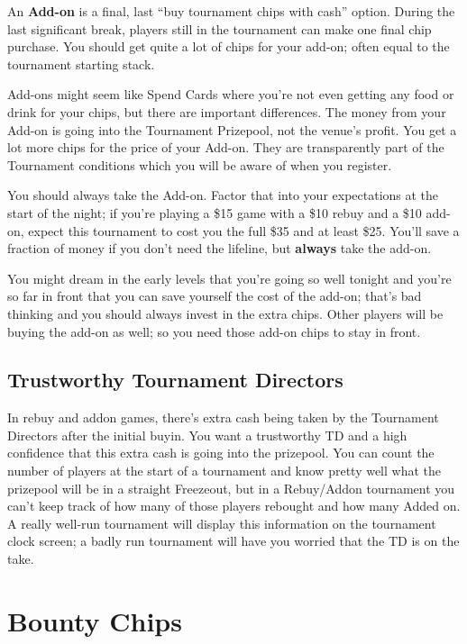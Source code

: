 An \textbf{Add-on} is a final, last ``buy tournament chips with cash''
option. During the last significant break, players still
in the tournament can make one final chip purchase. You should get
quite a lot of chips for your add-on; often equal to the tournament
starting stack.

Add-ons might seem like Spend Cards where you're not even
getting any food or drink for your chips, but there are important
differences. The money from your Add-on is going into the Tournament
Prizepool, not the venue's profit. You get a lot more chips for
the price of your Add-on. They are transparently part of the
Tournament conditions which you will be aware of when you register.

You should always take the Add-on. Factor that into your expectations
at the start of the night; if you're playing a \$15 game with a \$10
rebuy and a \$10 add-on, expect this tournament to cost you the full
\$35 and at least \$25. You'll save a fraction of money if you don't
need the lifeline, but \textbf{always} take the add-on.

You might dream in the early levels that you're going so well
tonight and you're so far in front that you can save yourself
the cost of the add-on; that's bad thinking and you should always
invest in the extra chips. Other players will be buying the add-on
as well; so you need those add-on chips to stay in front.

\subsection*{Trustworthy Tournament Directors}

In rebuy and addon games, there's extra cash being taken by
the Tournament Directors after the initial buyin. You want
a trustworthy TD and a high confidence that this extra cash is
going into the prizepool. You can count the number of players
at the start of a tournament and know pretty well what the prizepool
will be in a straight Freezeout, but in a Rebuy/Addon tournament
you can't keep track of how many of those players rebought and how
many Added on. A really well-run tournament will display this
information on the tournament clock screen; a badly run tournament
will have you worried that the TD is on the take.

\section{Bounty Chips}

